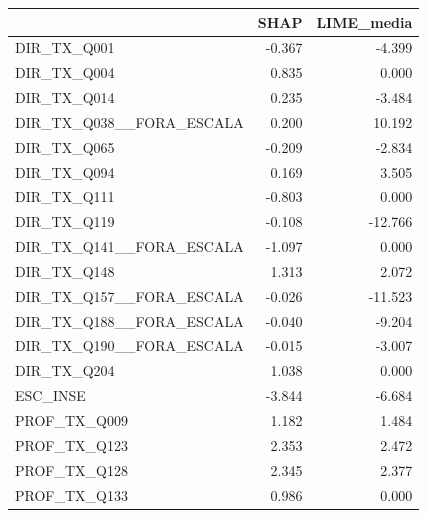 \begin{tabular}{lrr}
\toprule
 & SHAP & LIME\_media \\
\midrule
DIR\_TX\_Q001 & -0.367 & -4.399 \\
DIR\_TX\_Q004 & 0.835 & 0.000 \\
DIR\_TX\_Q014 & 0.235 & -3.484 \\
DIR\_TX\_Q038\_\_FORA\_ESCALA & 0.200 & 10.192 \\
DIR\_TX\_Q065 & -0.209 & -2.834 \\
DIR\_TX\_Q094 & 0.169 & 3.505 \\
DIR\_TX\_Q111 & -0.803 & 0.000 \\
DIR\_TX\_Q119 & -0.108 & -12.766 \\
DIR\_TX\_Q141\_\_FORA\_ESCALA & -1.097 & 0.000 \\
DIR\_TX\_Q148 & 1.313 & 2.072 \\
DIR\_TX\_Q157\_\_FORA\_ESCALA & -0.026 & -11.523 \\
DIR\_TX\_Q188\_\_FORA\_ESCALA & -0.040 & -9.204 \\
DIR\_TX\_Q190\_\_FORA\_ESCALA & -0.015 & -3.007 \\
DIR\_TX\_Q204 & 1.038 & 0.000 \\
ESC\_INSE & -3.844 & -6.684 \\
PROF\_TX\_Q009 & 1.182 & 1.484 \\
PROF\_TX\_Q123 & 2.353 & 2.472 \\
PROF\_TX\_Q128 & 2.345 & 2.377 \\
PROF\_TX\_Q133 & 0.986 & 0.000 \\
\bottomrule
\end{tabular}
